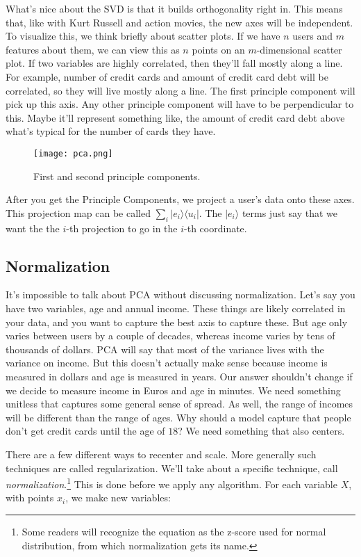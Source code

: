 \documentclass{amsbook}
\begin{document}
What's nice about the SVD is that it builds orthogonality right in.  This means that, like with Kurt Russell and action movies, the new axes will be independent.  To visualize this, we think briefly about scatter plots.  If we have $n$ users and $m$ features about them, we can view this as $n$ points on an $m$-dimensional scatter plot.  If two variables are highly correlated, then they'll fall mostly along a line.  For example, number of credit cards and amount of credit card debt will be correlated, so they will live mostly along a line.  The first principle component will pick up this axis.  Any other principle component will have to be perpendicular to this.  Maybe it'll represent something like, the amount of credit card debt above what's typical for the number of cards they have.

\begin{figure}
\caption{First and second principle components.}
\centering
\texttt{[image: pca.png]}
\end{figure}

After you get the Principle Components, we project a user's data onto these axes.  This projection map can be called $\sum_i |e_i\rangle\langle u_i|$.  The $|e_i\rangle$ terms just say that we want the the $i$-th projection to go in the $i$-th coordinate.

\subsection{Normalization}

It's impossible to talk about PCA without discussing normalization.  Let's say you have two variables, age and annual income.  These things are likely correlated in your data, and you want to capture the best axis to capture these.  But age only varies between users by a couple of decades, whereas income varies by tens of thousands of dollars.  PCA will say that most of the variance lives with the variance on income.  But this doesn't actually make sense because income is measured in dollars and age is measured in years.  Our answer shouldn't change if we decide to measure income in Euros and age in minutes.  We need something unitless that captures some general sense of spread.  As well, the range of incomes will be different than the range of ages.  Why should a model capture that people don't get credit cards until the age of $18$?  We need something that also centers.

There are a few different ways to recenter and scale.  More generally such techniques are called regularization.  We'll take about a specific technique, call {\em normalization}.\footnote{Some readers will recognize the equation as the z-score used for normal distribution, from which normalization gets its name.}  This is done before we apply any algorithm.  For each variable $X$, with points $x_i$, we make new variables:
\end{document}

